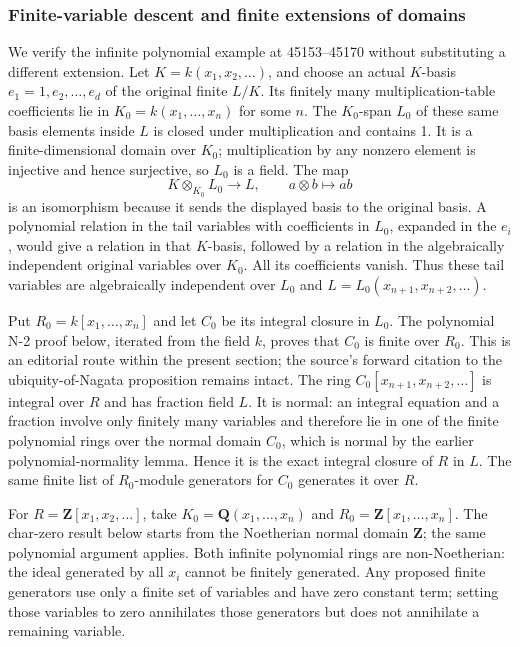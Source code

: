 \subsubsection{Finite-variable descent and finite extensions of domains}\label{algebra-proof-066-finite-variable-descent-and-finite-extensions-of-domains}

We verify the infinite polynomial example at 45153--45170 without substituting a different extension. Let \(K=k(x_1,x_2,\ldots)\), and choose an actual \(K\)-basis \(e_1=1,e_2,\ldots,e_d\) of the original finite \(L/K\). Its finitely many multiplication-table coefficients lie in \(K_0=k(x_1,\ldots,x_n)\) for some \(n\). The \(K_0\)-span \(L_0\) of these same basis elements inside \(L\) is closed under multiplication and contains 1. It is a finite-dimensional domain over \(K_0\); multiplication by any nonzero element is injective and hence surjective, so \(L_0\) is a field. The map \[
 K\otimes_{K_0}L_0\longrightarrow L,\qquad a\otimes b\longmapsto ab
\] is an isomorphism because it sends the displayed basis to the original basis. A polynomial relation in the tail variables with coefficients in \(L_0\), expanded in the \(e_i\), would give a relation in that \(K\)-basis, followed by a relation in the algebraically independent original variables over \(K_0\). All its coefficients vanish. Thus these tail variables are algebraically independent over \(L_0\) and \(L=L_0(x_{n+1},x_{n+2},\ldots)\).

Put \(R_0=k[x_1,\ldots,x_n]\) and let \(C_0\) be its integral closure in \(L_0\). The polynomial N-2 proof below, iterated from the field \(k\), proves that \(C_0\) is finite over \(R_0\). This is an editorial route within the present section; the source's forward citation to the ubiquity-of-Nagata proposition remains intact. The ring \(C_0[x_{n+1},x_{n+2},\ldots]\) is integral over \(R\) and has fraction field \(L\). It is normal: an integral equation and a fraction involve only finitely many variables and therefore lie in one of the finite polynomial rings over the normal domain \(C_0\), which is normal by the earlier polynomial-normality lemma. Hence it is the exact integral closure of \(R\) in \(L\). The same finite list of \(R_0\)-module generators for \(C_0\) generates it over \(R\).

For \(R=\mathbf Z[x_1,x_2,\ldots]\), take \(K_0=\mathbf Q(x_1,\ldots,x_n)\) and \(R_0=\mathbf Z[x_1,\ldots,x_n]\). The char-zero result below starts from the Noetherian normal domain \(\mathbf Z\); the same polynomial argument applies. Both infinite polynomial rings are non-Noetherian: the ideal generated by all \(x_i\) cannot be finitely generated. Any proposed finite generators use only a finite set of variables and have zero constant term; setting those variables to zero annihilates those generators but does not annihilate a remaining variable.

